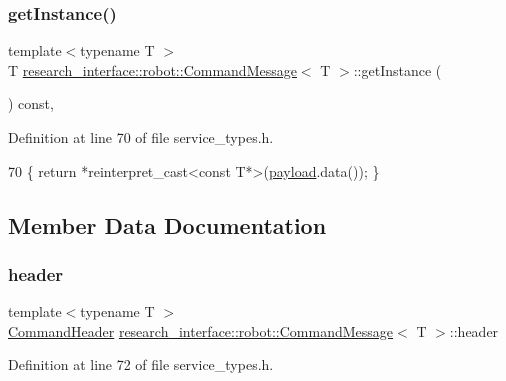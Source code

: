 \subsubsection{\texorpdfstring{get\+Instance()}{getInstance()}}
{\footnotesize\ttfamily template$<$typename T $>$ \\
T \hyperlink{structresearch__interface_1_1robot_1_1CommandMessage}{research\+\_\+interface\+::robot\+::\+Command\+Message}$<$ T $>$\+::get\+Instance (\begin{DoxyParamCaption}{ }\end{DoxyParamCaption}) const\hspace{0.3cm}{\ttfamily [inline]}, {\ttfamily [noexcept]}}



Definition at line 70 of file service\+\_\+types.\+h.


\begin{DoxyCode}
70 \{ \textcolor{keywordflow}{return} *\textcolor{keyword}{reinterpret\_cast<}\textcolor{keyword}{const }T*\textcolor{keyword}{>}(\hyperlink{structresearch__interface_1_1robot_1_1CommandMessage_a0af29b5860ddcb6ea5724a2116f38a7a}{payload}.data()); \}
\end{DoxyCode}


\subsection{Member Data Documentation}
\mbox{\label{structresearch__interface_1_1robot_1_1CommandMessage_a62fe6afacf849021d3b1c5b44ef3f364}} 
\subsubsection{\texorpdfstring{header}{header}}
{\footnotesize\ttfamily template$<$typename T $>$ \\
\hyperlink{structresearch__interface_1_1robot_1_1CommandHeader}{Command\+Header} \hyperlink{structresearch__interface_1_1robot_1_1CommandMessage}{research\+\_\+interface\+::robot\+::\+Command\+Message}$<$ T $>$\+::header}



Definition at line 72 of file service\+\_\+types.\+h.


